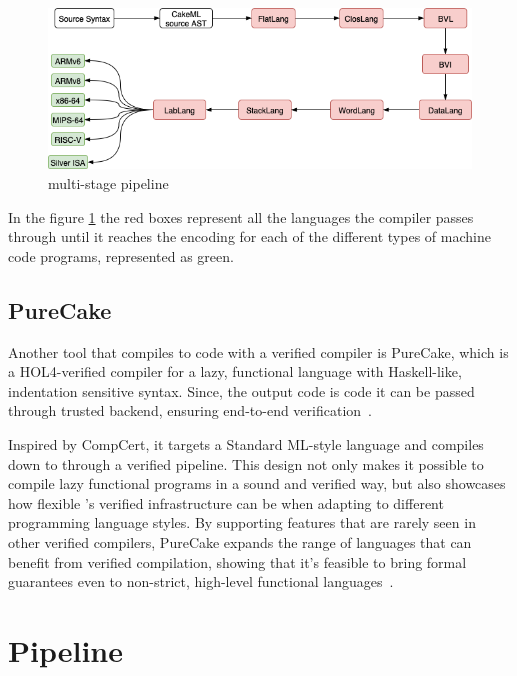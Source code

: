 \begin{figure}[H]
    \centering
    \includegraphics[width=\linewidth]{images/CakeMLPipeline.png}
    \caption{\cml multi-stage pipeline}
    \label{fig:CakeMLPipeline}
\end{figure}

In the figure \ref{fig:CakeMLPipeline} the red boxes represent all the languages the compiler passes through until it reaches the
encoding for each of the different types of machine code programs, represented as green.

\subsection{PureCake}

Another tool that compiles to \cml code with a verified compiler is PureCake, which is a HOL4-verified compiler for a lazy, 
functional language with Haskell-like, indentation sensitive syntax. Since, the output code is \cml code it can be passed 
through \cml trusted backend, ensuring end-to-end verification~\cite{KanabarVAMNPZ23}.

Inspired by CompCert, it targets a Standard ML-style language and compiles down to \cml through a verified pipeline.
This design not only makes it possible to compile lazy functional programs in a sound and verified way, but also showcases 
how flexible \cml's verified infrastructure can be when adapting to different programming language styles. 
By supporting features that are rarely seen in other verified compilers, PureCake expands the range of languages that can 
benefit from verified compilation, showing that it's feasible to bring formal guarantees even to non-strict, high-level 
functional languages~\cite{KanabarVAMNPZ23, KanabarKM24}.

\section{Pipeline}
\label{sec:Pipeline}

